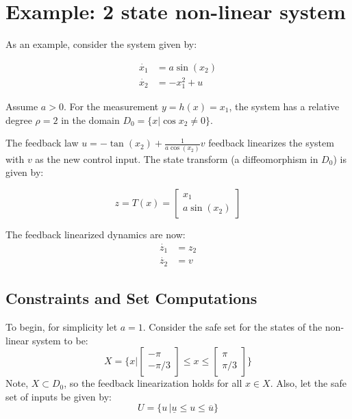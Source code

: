 \documentclass{article}[14pt]
\begin{document}
\section{Example: 2 state non-linear system}

As an example, consider the system given by:

\begin{subequations}
\begin{align}
\dot{x_1}&=a\sin(x_2) \\
\dot{x_2}&=-x_1^2 + u
\end{align}
\end{subequations}

Assume $a>0$. For the measurement $y=h(x)=x_1$, the system has a relative degree $\rho=2$ in the domain $D_0 = \{x|\cos{x_2}\neq0\}$. 

The feedback law $u = -\tan(x_2)+\frac{1}{a\cos(x_2)}v$ feedback linearizes the system with $v$ as the new control input. The state transform (a diffeomorphism in $D_0$) is given by:

\begin{equation}
z=T(x)=\begin{bmatrix} x_1 \\ a\sin(x_2) \end{bmatrix}
\end{equation}

The feedback linearized dynamics are now:
\begin{subequations}
\begin{align}
\dot{z_1}&=z_2 \\
\dot{z_2}&=v
\end{align}
\end{subequations}

\subsection{Constraints and Set Computations}

To begin, for simplicity let $a=1$.
Consider the safe set for the states of the non-linear system to be:
\begin{equation}
X=\{x|\begin{bmatrix} -\pi \\ -\pi/3 \end{bmatrix} \leq x \leq \begin{bmatrix} \pi \\ \pi/3 \end{bmatrix} \}
\end{equation}
Note, $X \subset D_0$, so the feedback linearization holds for all $x \in X$. Also, let the safe set of inputs be given by:
\begin{equation}
U=\{u\,|\underline{u}\leq u \leq \overline{u}\}
\end{equation}
\end{document}

